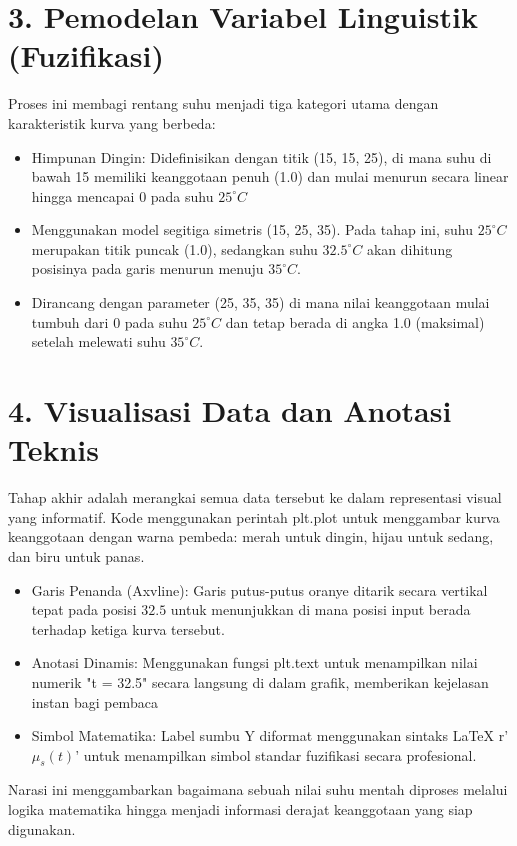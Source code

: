 \documentclass{article}
\begin{document}
\section*{3. Pemodelan Variabel Linguistik (Fuzifikasi)}
Proses ini membagi rentang suhu menjadi tiga kategori utama dengan karakteristik kurva yang berbeda:
\begin{itemize}
    \item Himpunan Dingin: Didefinisikan dengan titik (15, 15, 25), di mana suhu di bawah 15 memiliki keanggotaan penuh (1.0) dan mulai menurun secara linear hingga mencapai 0 pada suhu $25^\circ C$
    \item Menggunakan model segitiga simetris (15, 25, 35). Pada tahap ini, suhu $25^\circ C$ merupakan titik puncak (1.0), sedangkan suhu $32.5^\circ C$ akan dihitung posisinya pada garis menurun menuju $35^\circ C$.
    \item Dirancang dengan parameter (25, 35, 35) di mana nilai keanggotaan mulai tumbuh dari 0 pada suhu $25^\circ C$ dan tetap berada di angka 1.0 (maksimal) setelah melewati suhu $35^\circ C$.
\end{itemize}

\section*{4. Visualisasi Data dan Anotasi Teknis}
Tahap akhir adalah merangkai semua data tersebut ke dalam representasi visual yang informatif. Kode menggunakan perintah plt.plot untuk menggambar kurva keanggotaan dengan warna pembeda: merah untuk dingin, hijau untuk sedang, dan biru untuk panas.
\begin{itemize}
    \item Garis Penanda (Axvline): Garis putus-putus oranye ditarik secara vertikal tepat pada posisi $32.5$ untuk menunjukkan di mana posisi input berada terhadap ketiga kurva tersebut.
    \item Anotasi Dinamis: Menggunakan fungsi plt.text untuk menampilkan nilai numerik "t = 32.5" secara langsung di dalam grafik, memberikan kejelasan instan bagi pembaca
    \item Simbol Matematika: Label sumbu Y diformat menggunakan sintaks LaTeX r'$\mu_s(t)$' untuk menampilkan simbol standar fuzifikasi secara profesional.
\end{itemize}
Narasi ini menggambarkan bagaimana sebuah nilai suhu mentah diproses melalui logika matematika hingga menjadi informasi derajat keanggotaan yang siap digunakan.
\end{document}

